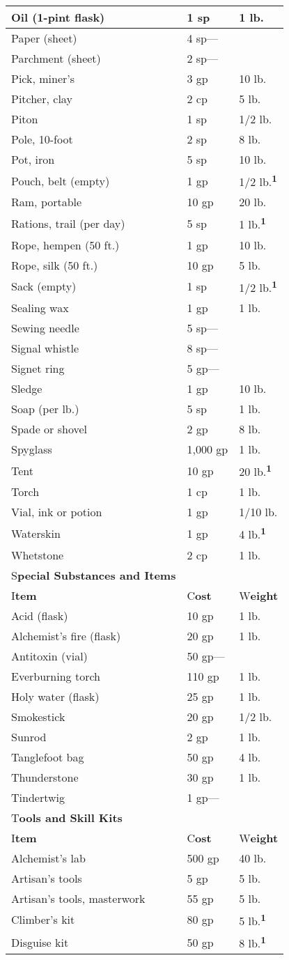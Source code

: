 \documentclass{article}
\begin{document}
\begin{tabular}{|>{\raggedright}p{182pt}|>{\raggedright}p{44pt}|>{\raggedright}p{40pt}|}
Oil (1-pint flask) & 1 sp & 1 lb.\tabularnewline
\hline
Paper (sheet) & 4 sp--- & \tabularnewline
\hline
Parchment (sheet) & 2 sp--- & \tabularnewline
\hline
Pick, miner's & 3 gp & 10 lb.\tabularnewline
\hline
Pitcher, clay & 2 cp & 5 lb.\tabularnewline
\hline
Piton & 1 sp & 1/2 lb.\tabularnewline
\hline
Pole, 10-foot & 2 sp & 8 lb.\tabularnewline
\hline
Pot, iron & 5 sp & 10 lb.\tabularnewline
\hline
Pouch, belt (empty) & 1 gp & 1/2 lb.\textsuperscript{\textbf{1}}\tabularnewline
\hline
Ram, portable & 10 gp & 20 lb.\tabularnewline
\hline
Rations, trail (per day) & 5 sp & 1 lb.\textsuperscript{\textbf{1}}\tabularnewline
\hline
Rope, hempen (50 ft.) & 1 gp & 10 lb.\tabularnewline
\hline
Rope, silk (50 ft.) & 10 gp & 5 lb.\tabularnewline
\hline
Sack (empty) & 1 sp & 1/2 lb.\textsuperscript{\textbf{1}}\tabularnewline
\hline
Sealing wax & 1 gp & 1 lb.\tabularnewline
\hline
Sewing needle & 5 sp--- & \tabularnewline
\hline
Signal whistle & 8 sp--- & \tabularnewline
\hline
Signet ring & 5 gp--- & \tabularnewline
\hline
Sledge & 1 gp & 10 lb.\tabularnewline
\hline
Soap (per lb.) & 5 sp & 1 lb.\tabularnewline
\hline
Spade or shovel & 2 gp & 8 lb.\tabularnewline
\hline
Spyglass & 1,000 gp & 1 lb.\tabularnewline
\hline
Tent & 10 gp & 20 lb.\textsuperscript{\textbf{1}}\tabularnewline
\hline
Torch & 1 cp & 1 lb.\tabularnewline
\hline
Vial, ink or potion & 1 gp & 1/10 lb.\tabularnewline
\hline
Waterskin & 1 gp & 4 lb.\textsuperscript{\textbf{1}}\tabularnewline
\hline
Whetstone & 2 cp & 1 lb.\tabularnewline
\hline
S\textbf{pecial Substances and Items} &  & \tabularnewline
\hline
I\textbf{tem} & C\textbf{ost} & W\textbf{eight}\tabularnewline
\hline
Acid (flask) & 10 gp & 1 lb.\tabularnewline
\hline
Alchemist's fire (flask) & 20 gp & 1 lb.\tabularnewline
\hline
Antitoxin (vial) & 50 gp--- & \tabularnewline
\hline
Everburning torch & 110 gp & 1 lb.\tabularnewline
\hline
Holy water (flask) & 25 gp & 1 lb.\tabularnewline
\hline
Smokestick & 20 gp & 1/2 lb.\tabularnewline
\hline
Sunrod & 2 gp & 1 lb.\tabularnewline
\hline
Tanglefoot bag & 50 gp & 4 lb.\tabularnewline
\hline
Thunderstone & 30 gp & 1 lb.\tabularnewline
\hline
Tindertwig & 1 gp--- & \tabularnewline
\hline
T\textbf{ools and Skill Kits} &  & \tabularnewline
\hline
I\textbf{tem} & C\textbf{ost} & W\textbf{eight}\tabularnewline
\hline
Alchemist's lab & 500 gp & 40 lb.\tabularnewline
\hline
Artisan's tools & 5 gp & 5 lb.\tabularnewline
\hline
Artisan's tools, masterwork & 55 gp & 5 lb.\tabularnewline
\hline
Climber's kit & 80 gp & 5 lb.\textsuperscript{\textbf{1}}\tabularnewline
\hline
Disguise kit & 50 gp & 8 lb.\textsuperscript{\textbf{1}}\tabularnewline

\end{tabular}
\end{document}
